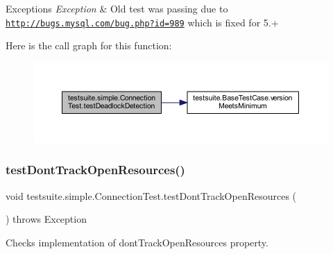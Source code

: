 \begin{DoxyExceptions}{Exceptions}
{\em Exception} & Old test was passing due to \href{http://bugs.mysql.com/bug.php?id=989}{\tt http\+://bugs.\+mysql.\+com/bug.\+php?id=989} which is fixed for 5.+ \\
\hline
\end{DoxyExceptions}
Here is the call graph for this function\+:
\nopagebreak
\begin{figure}[H]
\begin{center}
\leavevmode
\includegraphics[width=350pt]{classtestsuite_1_1simple_1_1_connection_test_afeddb6540162d5a3efe572d521dcc051_cgraph}
\end{center}
\end{figure}
\mbox{\label{classtestsuite_1_1simple_1_1_connection_test_a018eaff5a1cc1db390b843a77c50d63f}} 
\subsubsection{\texorpdfstring{test\+Dont\+Track\+Open\+Resources()}{testDontTrackOpenResources()}}
{\footnotesize\ttfamily void testsuite.\+simple.\+Connection\+Test.\+test\+Dont\+Track\+Open\+Resources (\begin{DoxyParamCaption}{ }\end{DoxyParamCaption}) throws Exception}

Checks implementation of \textquotesingle{}dont\+Track\+Open\+Resources\textquotesingle{} property.


